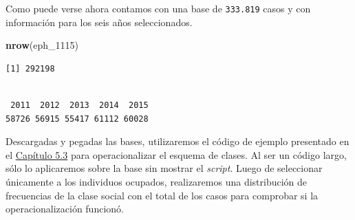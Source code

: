 \documentclass[
]{article}
\newenvironment{Shaded}{\begin{snugshade}}{\end{snugshade}}
\newcommand{\AttributeTok}[1]{\textcolor[rgb]{0.13,0.29,0.53}{#1}}
\newcommand{\ConstantTok}[1]{\textcolor[rgb]{0.56,0.35,0.01}{#1}}
\newcommand{\DecValTok}[1]{\textcolor[rgb]{0.00,0.00,0.81}{#1}}
\newcommand{\FunctionTok}[1]{\textcolor[rgb]{0.13,0.29,0.53}{\textbf{#1}}}
\newcommand{\NormalTok}[1]{#1}
\newcommand{\OtherTok}[1]{\textcolor[rgb]{0.56,0.35,0.01}{#1}}
\newcommand{\SpecialCharTok}[1]{\textcolor[rgb]{0.81,0.36,0.00}{\textbf{#1}}}
\newcommand{\StringTok}[1]{\textcolor[rgb]{0.31,0.60,0.02}{#1}}
\begin{document}
Como puede verse ahora contamos con una base de \texttt{333.819} casos y con información para los seis años seleccionados.

\begin{Shaded}
\begin{Highlighting}[]
\FunctionTok{nrow}\NormalTok{(eph\_1115)}
\end{Highlighting}
\end{Shaded}

\begin{verbatim}
[1] 292198
\end{verbatim}

\begin{Shaded}
\end{Shaded}

\begin{verbatim}

 2011  2012  2013  2014  2015 
58726 56915 55417 61112 60028 
\end{verbatim}

Descargadas y pegadas las bases, utilizaremos el código de ejemplo presentado en el \protect\hyperlink{operacion1}{Capítulo 5.3} para operacionalizar el esquema de clases. Al ser un código largo, sólo lo aplicaremos sobre la base sin mostrar el \emph{script}. Luego de seleccionar únicamente a los individuos ocupados, realizaremos una distribución de frecuencias de la clase social con el total de los casos para comprobar si la operacionalización funcionó.

\begin{Shaded}
\end{Shaded}
\end{document}

